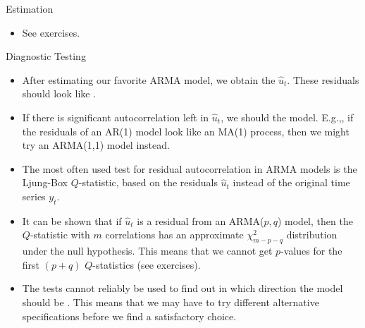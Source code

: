 \begin{frame}{Estimation}
\begin{itemize}
\item See exercises.

\end{itemize}
\end{frame}


\begin{frame}{Diagnostic Testing}
\begin{itemize}
\item
After estimating our favorite ARMA model, we obtain the  $\hat{u}%
_{t}$. These residuals should look like
.
\item If there is significant
autocorrelation left in $\hat{u}_{t}$, we should
 the model. E.g.,, if the residuals of an
AR(1) model look like an MA(1) process, then we might try an ARMA(1,1) model
instead.
\item The most often used test for residual autocorrelation in ARMA models is the
Ljung-Box $Q$-statistic, based on the residuals $\hat{u}_{t}$ instead of the
original time series $y_{t}$.
\item It can be shown that if $\hat{u}_{t}$ is a
residual from an ARMA($p,q$) model, then the $Q$-statistic with $m$
correlations has an approximate $\chi _{m-p-q}^{2}$ distribution under the
null hypothesis. This means that we cannot get $p$-values for the 
first $(p+q)$ $Q$-statistics (see exercises).

\item The tests cannot reliably be used to
find out in which direction the model should be . This means
that we may have to try different alternative specifications before we find
a satisfactory choice.
\end{itemize}
\end{frame}
